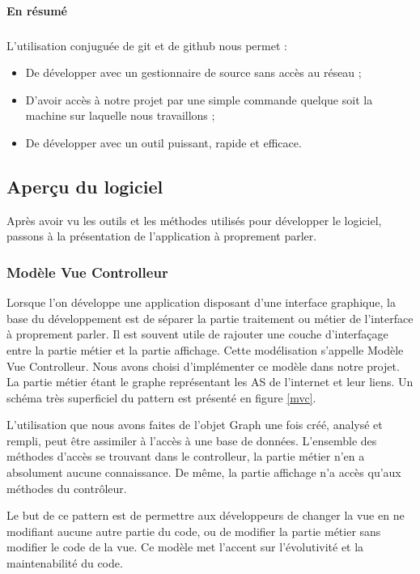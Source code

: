 \paragraph{En résumé}

\subparagraph{}L'utilisation conjuguée de git et de github nous permet :
\begin{itemize}
 \item De développer avec un gestionnaire de source sans accès au réseau ;
 \item D'avoir accès à notre projet par une simple commande quelque soit la machine sur laquelle nous travaillons ;
\item De développer avec un outil puissant, rapide et efficace.
\end{itemize}

\subsection{Aperçu du logiciel}
Après avoir vu les outils et les méthodes utilisés pour développer le logiciel, passons à la présentation de l'application à proprement parler.

\subsubsection{Modèle Vue Controlleur}
\label{mvcText}
Lorsque l'on développe une application disposant d'une interface graphique, la base du développement est de séparer la partie traitement ou métier de l'interface à proprement parler. Il est souvent utile de rajouter une couche d'interfaçage entre la partie métier et la partie affichage. Cette modélisation s'appelle Modèle Vue Controlleur. Nous avons choisi d'implémenter ce modèle dans notre projet. La partie métier étant le graphe représentant les AS de l'internet et leur liens. Un schéma très superficiel du pattern est présenté en figure \ref{mvc}.

L'utilisation que nous avons faites de l'objet Graph une fois créé, analysé et rempli, peut être assimiler à l'accès à une base de données. L'ensemble des méthodes d'accès se trouvant dans le controlleur, la partie métier n'en a absolument aucune connaissance. De même, la partie affichage n'a accès qu'aux méthodes du contrôleur.

Le but de ce pattern est de permettre aux développeurs de changer la vue en ne modifiant aucune autre partie du code, ou de modifier la partie métier sans modifier le code de la vue. Ce modèle met l'accent sur l'évolutivité et la maintenabilité du code. 

